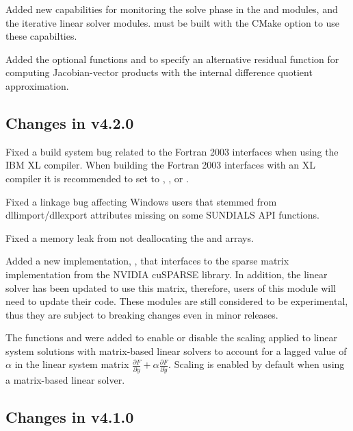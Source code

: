 Added new capabilities for monitoring the solve phase in the {\sunnonlinsolnewton}
and {\sunnonlinsolfixedpoint} modules, and the {\sundials} iterative linear solver
modules. {\sundials} must be built with the CMake option
 to use these capabilties.

Added the optional functions  and
 to specify an alternative residual function
for computing Jacobian-vector products with the internal difference quotient
approximation.


\subsection*{Changes in v4.2.0}

Fixed a build system bug related to the Fortran 2003 interfaces when using the
IBM XL compiler. When building the Fortran 2003 interfaces with an XL compiler
it is recommended to set  to ,
, or .

Fixed a linkage bug affecting Windows users that stemmed from dllimport/dllexport
attributes missing on some SUNDIALS API functions.

Fixed a memory leak from not deallocating the  and 
arrays.

Added a new  implementation, , that interfaces
to the sparse matrix implementation from the NVIDIA cuSPARSE library. In addition,
the  linear solver has been updated to
use this matrix, therefore, users of this module will need to update their code.
These modules are still considered to be experimental, thus they are subject to
breaking changes even in minor releases.

The functions  and
 were added to enable or disable the scaling
applied to linear system solutions with matrix-based linear solvers to account
for a lagged value of $\alpha$ in the linear system matrix
$\frac{\partial F}{\partial y} + \alpha\frac{\partial F}{\partial \dot{y}}$.
Scaling is enabled by default when using a matrix-based linear solver.

\subsection*{Changes in v4.1.0}

